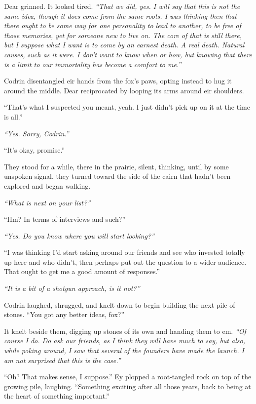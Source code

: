 Dear grinned. It looked tired. \emph{``That we did, yes. I will say that this is not the same idea, though it does come from the same roots. I was thinking then that there ought to be some way for one personality to lead to another, to be free of those memories, yet for someone new to live on. The core of that is still there, but I suppose what I want is to come by an earnest death. A real death. Natural causes, such as it were. I don't want to know when or how, but knowing that there is a limit to our immortality has become a comfort to me.''}

Codrin disentangled eir hands from the fox's paws, opting instead to hug it around the middle. Dear reciprocated by looping its arms around eir shoulders.

``That's what I suspected you meant, yeah. I just didn't pick up on it at the time is all.''

\emph{``Yes. Sorry, Codrin.''}

``It's okay, promise.''

They stood for a while, there in the prairie, silent, thinking, until by some unspoken signal, they turned toward the side of the cairn that hadn't been explored and began walking.

\emph{``What is next on your list?''}

``Hm? In terms of interviews and such?''

\emph{``Yes. Do you know where you will start looking?''}

``I was thinking I'd start asking around our friends and see who invested totally up here and who didn't, then perhaps put out the question to a wider audience. That ought to get me a good amount of responses.''

\emph{``It is a bit of a shotgun approach, is it not?''}

Codrin laughed, shrugged, and knelt down to begin building the next pile of stones. ``You got any better ideas, fox?''

It knelt beside them, digging up stones of its own and handing them to em. \emph{``Of course I do. Do ask our friends, as I think they will have much to say, but also, while poking around, I saw that several of the founders have made the launch. I am not surprised that this is the case.''}

``Oh? That makes sense, I suppose.'' Ey plopped a root-tangled rock on top of the growing pile, laughing. ``Something exciting after all those years, back to being at the heart of something important.''

